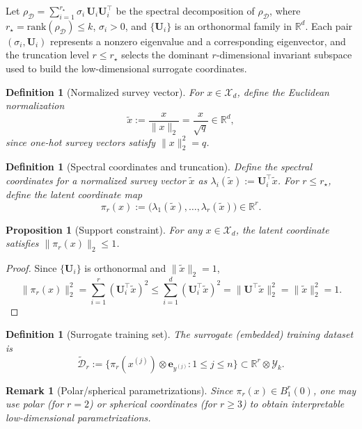 \documentclass[preprint,11pt]{elsarticle}
\newtheorem{Definition}[Theorem]{Definition}
\newtheorem{Proposition}[Theorem]{Proposition}
\newtheorem{Remark}[Theorem]{Remark}
\newcommand{\R}{\mathbb{R}}
\begin{document}
Let $\rho_{\mathcal D}=\sum_{i=1}^{r_\star}\sigma_i\,\mathbf U_i\mathbf U_i^\top$ be the spectral decomposition of $\rho_{\mathcal D}$,
where $r_\star=\mathrm{rank}(\rho_{\mathcal D})\le k$, $\sigma_i>0$, and $\{\mathbf U_i\}$ is an orthonormal family in $\R^d$.
Each pair $(\sigma_i,\mathbf U_i)$ represents a nonzero eigenvalue and a corresponding eigenvector, and the truncation level $r\le r_\star$
selects the dominant $r$-dimensional invariant subspace used to build the low-dimensional surrogate coordinates.
\begin{Definition}[Normalized survey vector]
For $x\in\mathcal X_d$, define the Euclidean normalization
\[
\widetilde x := \frac{x}{\|x\|_2}=\frac{x}{\sqrt{q}}\in\R^d,
\]
since one-hot survey vectors satisfy $\|x\|_2^2=q$.
\end{Definition}

\begin{Definition}[Spectral coordinates and truncation]
Define the spectral coordinates for a normalized survey vector $\widetilde{x}$ as $\lambda_i(\widetilde x):=\mathbf U_i^\top \widetilde x$.
For $r\le r_\star$, define the latent coordinate map
\[
\pi_r(x):=\bigl(\lambda_1(\widetilde x),\dots,\lambda_r(\widetilde x)\bigr)\in\R^r.
\]
\end{Definition}

\begin{Proposition}[Support constraint]
For any $x\in\mathcal X_d$, the latent coordinate satisfies $\|\pi_r(x)\|_2\le 1$.
\end{Proposition}

\begin{proof}
Since $\{\mathbf U_i\}$ is orthonormal and $\|\widetilde x\|_2=1$,
\[
\|\pi_r(x)\|_2^2=\sum_{i=1}^r (\mathbf U_i^\top \widetilde x)^2
\le \sum_{i=1}^{d} (\mathbf U_i^\top \widetilde x)^2=\| \mathbf U^\top\widetilde x\|_2^2=\|\widetilde x\|_2^2=1.
\]
\end{proof}

\begin{Definition}[Surrogate training set]
The surrogate (embedded) training dataset is
\[
\widetilde{\mathcal D}_r := \{ \pi_r(x^{(j)})\otimes \mathbf e_{y^{(j)}} : 1\le j\le n\}\subset \R^r\otimes \mathcal Y_k.
\]
\end{Definition}

\begin{Remark}[Polar/spherical parametrizations]
Since $\pi_r(x)\in B_1^r(0)$, one may use polar (for $r=2$) or spherical coordinates (for $r\ge 3$)
to obtain interpretable low-dimensional parametrizations.
\end{Remark}
\end{document}
